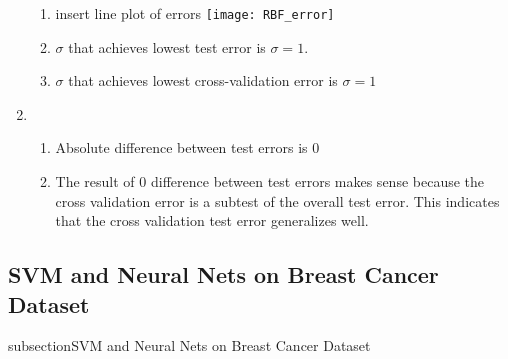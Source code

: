 \documentclass[english]{article}
\begin{document}
\begin{enumerate}
\begin{enumerate}
\item insert line plot of errors \newline
\texttt{[image: RBF\_error]}\newline

\item $\sigma$ that achieves lowest test error is $\sigma = 1$.
\item $\sigma$ that achieves lowest cross-validation error is $\sigma = 1$
\end{enumerate}
\item 
\begin{enumerate}
\item Absolute difference between test errors is $0$
\item The result of $0$ difference between test errors makes sense because the cross validation error is a subtest of the overall test error. This indicates that the cross validation test error generalizes well.
\end{enumerate}
\end{enumerate}
\subsection{SVM and Neural Nets on Breast Cancer Dataset}
subsection{SVM and Neural Nets on Breast Cancer Dataset}
\end{document}
